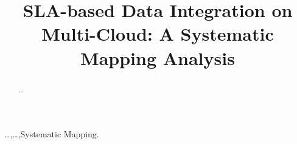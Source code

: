 \documentclass[preprint,12pt]{elsarticle}
\theoremstyle{plain}
\theoremstyle{plain}
\theoremstyle{plain}
\theoremstyle{plain}
\begin{document}
\begin{frontmatter}



\title{SLA-based Data Integration on Multi-Cloud: A Systematic Mapping Analysis}




\author[inst1]{}
\author[inst2]{}
\author[inst3]{}
\author[inst4]{}
\author[inst5]{}
\author[inst5]{}


\address[inst1]{}
\address[inst2]{}
\address[inst3]{}
\address[inst4]{}
\address[inst5]{} 
  
\begin{abstract}

\ldots
\end{abstract}

\begin{keyword}
\ldots \sep \ldots \sep Systematic Mapping.


\end{keyword}

\end{frontmatter}


\end{document}

